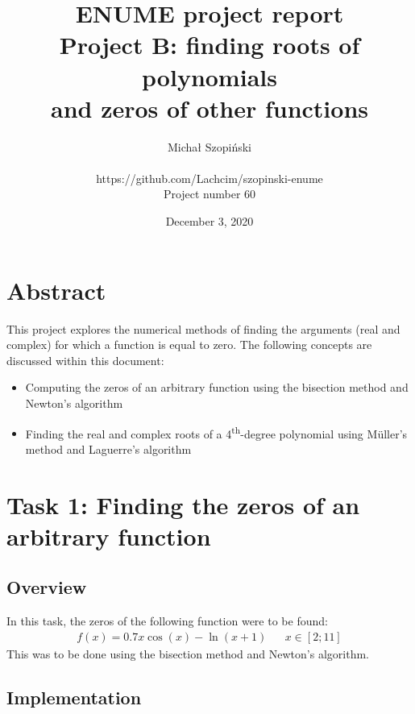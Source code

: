 \documentclass{article}
\begin{document}
	\title{ENUME project report\\Project B: finding roots of polynomials \\
	and zeros of other functions}
	\author{Michał Szopiński\\\\
	https://github.com/Lachcim/szopinski-enume\\
	Project number 60}
	\date{December 3, 2020}
	\maketitle
	
	
	\setcounter{section}{-1}
	\section{Abstract}
	
	This project explores the numerical methods of finding the arguments (real
	and complex) for which a function is equal to zero. The following concepts
	are discussed within this document:
	
	\begin{itemize}
		\item Computing the zeros of an arbitrary function using the bisection
		method and Newton's algorithm
		\item Finding the real and complex roots of a
		4\textsuperscript{th}-degree polynomial using M{\"u}ller's method and
		Laguerre's algorithm
	\end{itemize}
	
	\newpage
	
	\section{Task 1: Finding the zeros of an arbitrary function}
	
	\subsection{Overview}
	
	In this task, the zeros of the following function were to be found:
	\begin{align*}
		f(x) = 0.7 x \cos(x) - \ln(x + 1) && x \in [2; 11]
	\end{align*}
	This was to be done using the bisection method and Newton's algorithm.
	
	\subsection{Implementation}
	
\end{document}
